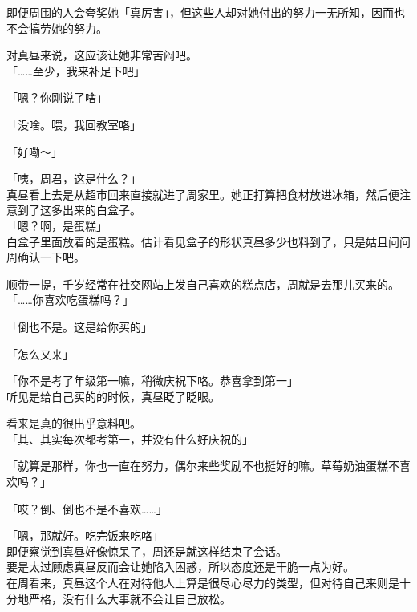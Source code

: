 即便周围的人会夸奖她「真厉害」，但这些人却对她付出的努力一无所知，因而也不会犒劳她的努力。

对真昼来说，这应该让她非常苦闷吧。\\

「……至少，我来补足下吧」

「嗯？你刚说了啥」

「没啥。喂，我回教室咯」

「好嘞～」\\

\vspace{2\baselineskip}

「咦，周君，这是什么？」\\

真昼看上去是从超市回来直接就进了周家里。她正打算把食材放进冰箱，然后便注意到了这多出来的白盒子。\\

「嗯？啊，是蛋糕」\\

白盒子里面放着的是蛋糕。估计看见盒子的形状真昼多少也料到了，只是姑且问问周确认一下吧。

顺带一提，千岁经常在社交网站上发自己喜欢的糕点店，周就是去那儿买来的。\\

「……你喜欢吃蛋糕吗？」

「倒也不是。这是给你买的」

「怎么又来」

「你不是考了年级第一嘛，稍微庆祝下咯。恭喜拿到第一」\\

听见是给自己买的的时候，真昼眨了眨眼。

看来是真的很出乎意料吧。\\

「其、其实每次都考第一，并没有什么好庆祝的」

「就算是那样，你也一直在努力，偶尔来些奖励不也挺好的嘛。草莓奶油蛋糕不喜欢吗？」

「哎？倒、倒也不是不喜欢……」

「嗯，那就好。吃完饭来吃咯」\\

即便察觉到真昼好像惊呆了，周还是就这样结束了会话。\\

要是太过顾虑真昼反而会让她陷入困惑，所以态度还是干脆一点为好。\\

在周看来，真昼这个人在对待他人上算是很尽心尽力的类型，但对待自己来则是十分地严格，没有什么大事就不会让自己放松。

